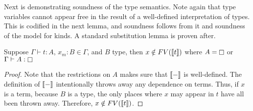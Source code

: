 Next is demonstrating soundness of the type semantics.
Note again that type variables cannot appear free in the result of a well-defined interpretation of types.
This is codified in the next lemma, and soundness follows from it and soundness of the model for kinds.
A standard substitution lemma is proven after.

\begin{lemma}
    \label{lem:3:var_not_in_sema_when_kind}
    Suppose $\Gamma \vdash t : A$, $x_m : B \in \Gamma$, and $B$ type, then $x \notin FV(\llbracket t \rrbracket)$
    where $A = \kind$ or $\Gamma \vdash A : \kind$
\end{lemma}
\begin{proof}
    Note that the restrictions on $A$ makes sure that $\llbracket - \rrbracket$ is well-defined.
    The definition of $\llbracket - \rrbracket$ intentionally throws away any dependence on terms.
    Thus, if $x$ is a term, because $B$ is a type, the only places where $x$ may appear in $t$ have all been thrown away.
    Therefore, $x \notin FV(\llbracket t \rrbracket)$.
\end{proof}

